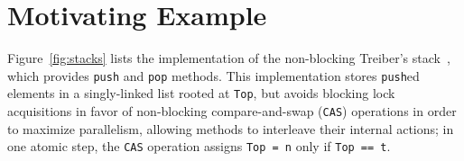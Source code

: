 
\section{Motivating Example}
\label{sec:motivation}

Figure~\ref{fig:stacks} lists the implementation of the non-blocking 
Treiber's stack~\cite{Treiber'86}, which provides {\tt push} and {\tt pop} methods. 
This implementation stores {\tt push}ed elements in a
singly-linked list rooted at {\tt Top}, but avoids blocking lock acquisitions in favor of non-blocking
compare-and-swap ({\tt CAS}) operations in order to maximize parallelism,
allowing methods to interleave their internal actions; in one atomic step, the
{\tt CAS} operation assigns {\tt Top = n} only if {\tt Top == t}.

